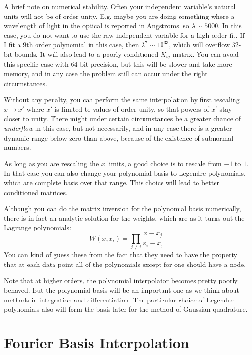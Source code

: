 A brief note on numerical stability. Often your independent variable's
natural units will not be of order unity. E.g. maybe you are doing
something where a wavelength of light in the optical is reported in
Angstroms, so $\lambda \sim 5000$. In this case, you do not want to
use the raw independent variable for a high order fit. If I fit a 9th
order polynomial in this case, then $\lambda^7 \sim 10^{33}$, which
will overflow 32-bit bounds. It will also lead to a poorly conditioned
$K_{ij}$ matrix. You can avoid this specific case with 64-bit
precision, but this will be slower and take more memory, and in any
case the problem still can occur under the right circumstances.

Without any penalty, you can perform the same interpolation by first
rescaling $x\rightarrow x'$ where $x'$ is limited to values of order
unity, so that powers of $x'$ stay closer to unity. There might under
certain circumstances be a greater chance of {\it underflow} in this
case, but not necessarily, and in any case there is a greater dynamic
range below zero than above, because of the existence of subnormal
numbers. 

As long as you are rescaling the $x$ limits, a good choice is to
rescale from $-1$ to $1$. In that case you can also change your
polynomial basis to Legendre polynomials, which are complete basis
over that range. This choice will lead to better conditioned
matrices.

Although you can do the matrix inversion for the polynomial basis
numerically, there is in fact an analytic solution for the weights,
which are as it turns out the Lagrange polynomials:
\begin{equation}
W(x, x_i) = \prod_{j\ne i} \frac{x - x_j}{x_i - x_j}
\end{equation}
You can kind of guess these from the fact that they need to have the
property that at each data point all of the polynomials except for one
should have a node. 

Note that at higher orders, the polynomial interpolator becomes pretty
poorly behaved. But the polynomial basis will be an important one as
we think about methods in integration and differentiation. The
particular choice of Legendre polynomials also will form the basis
later for the method of Gaussian quadrature.

\section{Fourier Basis Interpolation}

